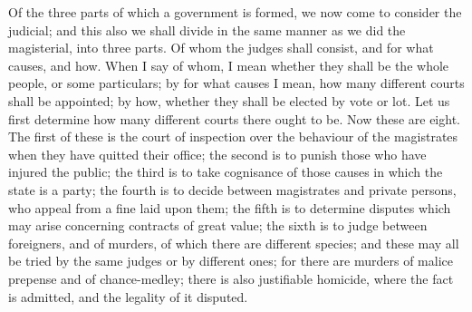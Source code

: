 
Of the three parts of which a government is formed, we now come to
consider the judicial; and this also we shall divide in the same manner as
we did the magisterial, into three parts. Of whom the judges shall
consist, and for what causes, and how. When I say of whom, I mean whether
they shall be the whole people, or some particulars; by for what causes I
mean, how many different courts shall be appointed; by how, whether they
shall be elected by vote or lot. Let us first determine how many different
courts there ought to be. Now these are eight. The first of these is the
court of inspection over the behaviour of the magistrates when they have
quitted their office; the second is to punish those who have injured the
public; the third is to take cognisance of those causes in which the state
is a party; the fourth is to decide between magistrates and private
persons, who appeal from a fine laid upon them; the fifth is to determine
disputes which may arise concerning contracts of great value; the sixth is
to judge between foreigners, and of murders, of which there are different
species; and these may all be tried by the same judges or by different
ones; for there are murders of malice prepense and of chance-medley; there
is also justifiable homicide, where the fact is admitted, and the legality
of it disputed.

